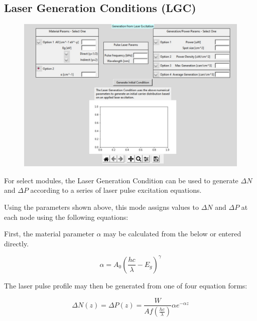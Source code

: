 \documentclass[11pt,letterpaper,titlepage]{article}
\begin{document}
			\subsection {Laser Generation Conditions (LGC)}
			\begin{figure}[H]
				\label{fig:LGC_blank}
				\centering
				\includegraphics[scale=0.6]{"LGC_blank"}
			\end{figure}
		
			\par For select modules, the Laser Generation Condition can be used to generate $\Delta N$ and $\Delta P$ according to a series of laser pulse excitation equations.
			
			\par Using the parameters shown above, this mode assigns values to $\Delta N$ and $\Delta P$ at each node using the following equations:
	
			\par First, the material parameter $\alpha$ may be calculated from the below or entered directly.
			
			\begin{equation}
				\label{eq:LGC_absorption}
				\alpha = A_{0}\left(\frac{hc}{\lambda} - E_{g}\right)^{\gamma}
			\end{equation}
		
			\par The laser pulse profile may then be generated from one of four equation forms:
			
			\begin{equation}
				\label{eq:LGC_power}
				\Delta N(z) = \Delta P(z) = \frac{W}{Af\left(\frac{hc}{\lambda}\right)} \alpha e^{-\alpha z}
			\end{equation}
		
\end{document}
